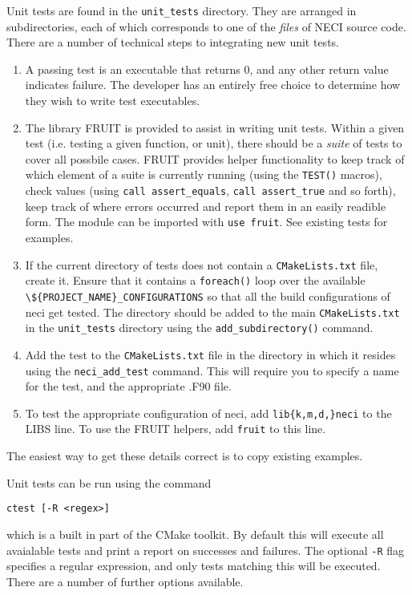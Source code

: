 \documentclass[a4paper,notitlepage,dvipsnames]{scrreprt}
\let\code\lstinline
\begin{document}
{{{    Unit tests are found in the \code{unit_tests} directory. They are arranged in subdirectories,
    each of which corresponds to one of the \emph{files} of NECI source code. There are a number
    of technical steps to integrating new unit tests.
    \begin{enumerate}
        \item
            A passing test is an executable that returns 0, and any other return value indicates
            failure. The developer has an entirely free choice to determine how they wish to
            write test executables.
        \item
            The library FRUIT is provided to assist in writing unit tests. Within a given test
            (i.e. testing a given function, or unit), there should be a \emph{suite} of tests
            to cover all possbile cases. FRUIT provides helper functionality to keep track of
            which element of a suite is currently running (using the \code{TEST()} macros),
            check values (using \code{call assert_equals}, \code{call assert_true} and so forth),
            keep track of where errors occurred and report them in an easily readible form. The
            module can be imported with \code{use fruit}. See existing tests for examples.
        \item
            If the current directory of tests does not contain a \code{CMakeLists.txt} file, create it.
            Ensure that it contains a \code{foreach()} loop over the available
            \code|\${PROJECT_NAME}_CONFIGURATIONS| so that all the build configurations of
            neci get tested. The directory should be added to the main \code{CMakeLists.txt} in
            the \code{unit_tests} directory using the \code{add_subdirectory()} command.
        \item
            Add the test to the \code{CMakeLists.txt} file in the directory in which it resides
            using the \code{neci_add_test} command. This will require you to specify a name for
            the test, and the appropriate .F90 file.
        \item
            To test the appropriate configuration of neci, add \code|lib{k,m,d,}neci| to the
            LIBS line. To use the FRUIT helpers, add \code{fruit} to this line.
    \end{enumerate}
    The easiest way to get these details correct is to copy existing examples.

    Unit tests can be run using the command
    \begin{lstlisting}[gobble=4]
        ctest [-R <regex>]
    \end{lstlisting}
    which is a built in part of the CMake toolkit. By default this will execute all avaialable
    tests and print a report on successes and failures. The optional \code{-R} flag specifies
    a regular expression, and only tests matching this will be executed. There are a number
    of further options available.

}}}
\end{document}
